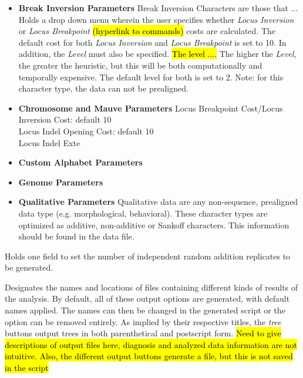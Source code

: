         \begin{itemize} 
        		\item \textbf{Break Inversion Parameters} Break Inversion Characters are those that ...
		Holds a drop down menu wherein the user specifies
		 whether \emph{Locus Inversion} or \emph{Locus Breakpoint} \hl{(hyperlink to commands)}
		 costs are calculated.
		 The default cost for both \emph{Locus Inversion} and \emph{Locus Breakpoint} is set to 10. 
		 In addition, the \emph{Level} must also be specified.  \hl{The level ....}  The higher the \emph{Level}, 
		 the greater the heuristic, but this will be both computationally and temporally expensive. 
		 The default level for both is set to 2.  Note: for this character type, the data can not be prealigned.
       		\item  \textbf{Chromosome and Mauve Parameters} 	Locus Breakpoint Cost/Locus Inversion Cost: default 10\\
        				Locus Indel Opening Cost: default 10\\
				Locus Indel Exte
		\item \textbf{Custom Alphabet Parameters}
		\item \textbf{Genome Parameters}
		\item \textbf{Qualitative Parameters} Qualitative data are any non-sequence, prealigned 
		data type (e.g. morphological, behavioral). These character types are optimized as additive, 
		non-additive or Sankoff characters. This information should be found in the data file.
	\end{itemize}    
\begin{description}
\setlength{\labelsep}{5pt}
\setlength{\itemindent}{0pt}%
    \item[Search Parameters]
        Holds one field to set the number of independent random addition replicates to be generated.
    \item[Output Files]
        Designates the names and locations of files containing different kinds of results of the analysis. 
By default, all of these output options are generated, with default names applied.  The names can then be changed 
in the generated script or the option can be removed entirely.  As implied by their respective titles, the \emph{tree} 
buttons output trees in both parenthetical and postscript form.
        \hl{Need to give descriptions of output files here, diagnosis and analyzed data information are not intuitive.
        Also, the different output buttons generate a file, but this is not saved in the script}
\end{description}


